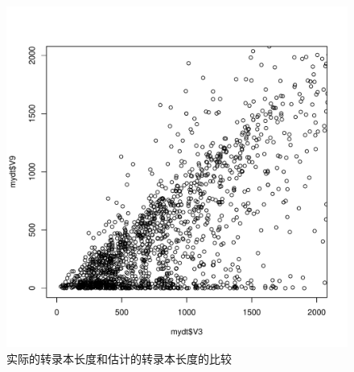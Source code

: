\begin{figure}[!t]
\centering
\includegraphics[width=\textwidth]{figures/lenest/real-len-VS-est-len.pdf}
\caption{实际的转录本长度和估计的转录本长度的比较}
\label{real-len-VS-est-len}
\end{figure}

